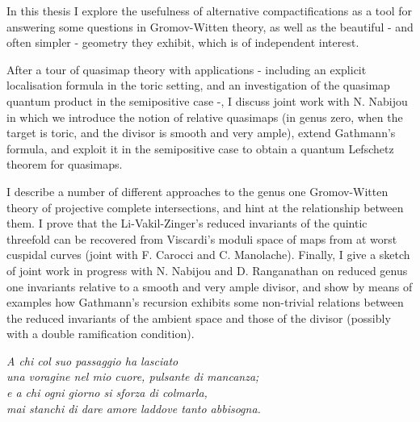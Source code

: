 \documentclass[a4paper,11pt,twoside,final]{book}
\makeatletter
\def\cleardoublepage{\clearpage\if@twoside \ifodd\c@page\else
\hbox{}
\vspace*{\fill}
\vspace{\fill}
\thispagestyle{empty}
\newpage
\if@twocolumn\hbox{}\newpage\fi\fi\fi}
\theoremstyle{definition}
\theoremstyle{definition}
\numberwithin{equation}{chapter}    %
\numberwithin{section}{chapter} %
\makeatother
\begin{document}

\newpage

\cleardoublepage

{\thispagestyle{empty}
\null
\vfill
{}

\medskip

\noindent In this thesis I explore the usefulness of alternative compactifications as a tool for answering some questions in Gromov-Witten theory, as well as the beautiful - and often simpler - geometry they exhibit, which is of independent interest.

After a tour of quasimap theory with applications - including an explicit localisation formula in the toric setting, and an investigation of the quasimap quantum product in the semipositive case -, I discuss joint work with N. Nabijou in which we introduce the notion of relative quasimaps (in genus zero, when the target is toric, and the divisor is smooth and very ample), extend Gathmann's formula, and exploit it in the semipositive case to obtain a quantum Lefschetz theorem for quasimaps.

I describe a number of different approaches to the genus one Gromov-Witten theory of projective complete intersections, and hint at the relationship between them. I prove that the Li-Vakil-Zinger's reduced invariants of the quintic threefold can be recovered from Viscardi's moduli space of maps from at worst cuspidal curves (joint with F. Carocci and C. Manolache). Finally, I give a sketch of joint work in progress with N. Nabijou and D. Ranganathan on reduced genus one invariants relative to a smooth and very ample divisor, and show by means of examples how Gathmann's recursion exhibits some non-trivial relations between the reduced invariants of the ambient space and those of the divisor (possibly with a double ramification condition).

\vspace{5cm}
\begin{flushright}
 {\it A chi col suo passaggio ha lasciato \\ una voragine nel mio cuore, pulsante di mancanza; \\ e a chi ogni giorno si sforza di colmarla, \\ mai stanchi di dare amore laddove tanto abbisogna.}
\end{flushright}
}
\end{document}
